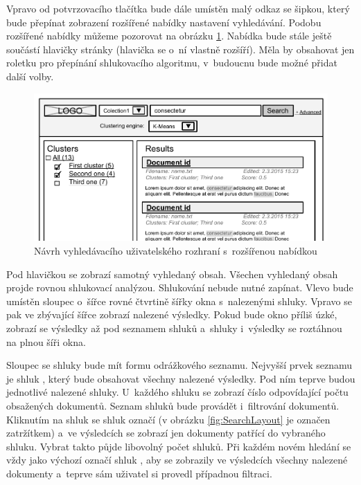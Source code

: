 Vpravo od potvrzovacího tlačítka bude dále umístěn malý odkaz se šipkou, který bude přepínat zobrazení rozšířené nabídky nastavení vyhledávání. Podobu rozšířené nabídky můžeme pozorovat na obrázku \ref{fig:AdvancedLayout}. Nabídka bude stále ještě součástí hlavičky stránky (hlavička se o~ní vlastně rozšíří). Měla by obsahovat jen roletku pro přepínání shlukovacího algoritmu, v~budoucnu bude možné přidat další volby.

\begin{figure}[h]
\begin{center}
\includegraphics[width=13cm]{AdvancedLayout}
\caption{Návrh vyhledávacího uživatelského rozhraní s~rozšířenou nabídkou}
\label{fig:AdvancedLayout}
\end{center}
\end{figure}

Pod hlavičkou se zobrazí samotný vyhledaný obsah. Všechen vyhledaný obsah projde rovnou shlukovací analýzou. Shlukování nebude nutné zapínat. Vlevo bude umístěn sloupec o~šířce rovné čtvrtině šířky okna s~nalezenými shluky. Vpravo se pak ve zbývající šířce zobrazí nalezené výsledky. Pokud bude okno příliš úzké, zobrazí se výsledky až pod seznamem shluků a~shluky i~výsledky se roztáhnou na plnou šíři okna.

Sloupec se shluky bude mít formu odrážkového seznamu. Nejvyšší prvek seznamu je shluk , který bude obsahovat všechny nalezené výsledky. Pod ním teprve budou jednotlivé nalezené shluky. U~každého shluku se zobrazí číslo odpovídající počtu obsažených dokumentů. Seznam shluků bude provádět i~filtrování dokumentů. Kliknutím na shluk se shluk označí (v obrázku \ref{fig:SearchLayout} je označen zatržítkem) a~ve výsledcích se zobrazí jen dokumenty patřící do vybraného shluku. Vybrat takto půjde libovolný počet shluků. Při každém novém hledání se vždy jako výchozí označí shluk , aby se zobrazily ve výsledcích všechny nalezené dokumenty a~teprve sám uživatel si provedl případnou filtraci.


